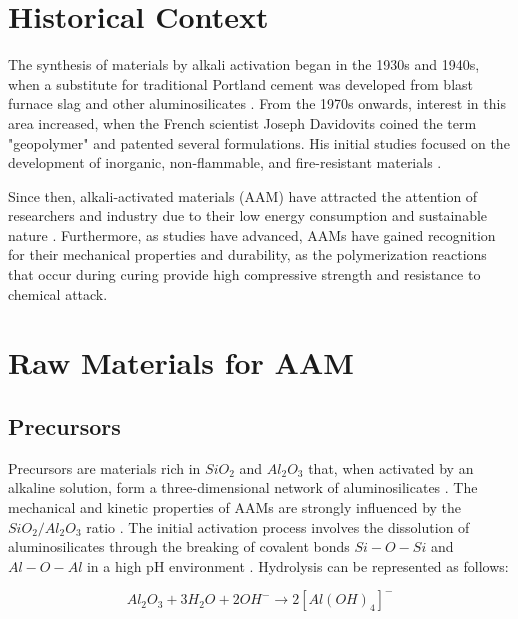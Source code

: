 \section{Historical Context}

The synthesis of materials by alkali activation began in the 1930s and 1940s, when a substitute for traditional Portland cement was developed from blast furnace slag and other aluminosilicates \cite{pachecotorgal2014handbook}.
From the 1970s onwards, interest in this area increased, when the French scientist Joseph Davidovits coined the term "geopolymer" and patented several formulations. His initial studies focused on the development of inorganic, non-flammable, and fire-resistant materials \cite{provis2009geopolymers}.


Since then, alkali-activated materials (AAM) have attracted the attention of researchers and industry due to their low energy consumption and sustainable nature \cite{qin2022onepart}.
Furthermore, as studies have advanced, AAMs have gained recognition for their mechanical properties and durability, as the polymerization reactions that occur during curing provide high compressive strength and resistance to chemical attack.

\section{Raw Materials for AAM}

\subsection{Precursors}

Precursors are materials rich in $SiO_2$ and $Al_2O_3$ that, when activated by an alkaline solution, form a three-dimensional network of aluminosilicates \cite{rakhimova2019metakaolin}.
The mechanical and kinetic properties of AAMs are strongly influenced by the $SiO_2/Al_2O_3$ ratio \cite{provis2007geopolymerisation}.
The initial activation process involves the dissolution of aluminosilicates through the breaking of covalent bonds $Si-O-Si$ and $Al-O-Al$ in a high pH environment \cite{Severo2013}. Hydrolysis can be represented as follows:

\begin{equation}
  Al_2O_3 + 3H_2O + 2OH^- \rightarrow 2\left[Al(OH)_4\right]^- 
\end{equation}

